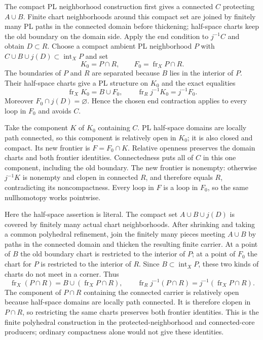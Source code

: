The compact PL neighborhood construction first gives a connected $C$
protecting $A\cup B$. Finite chart neighborhoods around this compact set
are joined by finitely many PL paths in the connected domain before
thickening; half-space charts keep the old boundary on the domain side.
Apply the end condition to $j^{-1}C$ and obtain $D\subset R$.
Choose a compact ambient PL neighborhood $P$ with
$C\cup B\cup j(D)\subset\operatorname{int}_X P$ and set
\[
 K_0=P\cap R,\qquad F_0=\operatorname{fr}_X P\cap R.
\]
The boundaries of $P$ and $R$ are separated because $B$ lies in the
interior of $P$. Their half-space charts give a PL structure on $K_0$
and the exact equalities
\[
 \operatorname{fr}_X K_0=B\cup F_0,
 \qquad\operatorname{fr}_R j^{-1}K_0=j^{-1}F_0.
\]
Moreover $F_0\cap j(D)=\varnothing$. Hence the chosen end contraction
applies to every loop in $F_0$ and avoids $C$.

Take the component $K$ of $K_0$ containing $C$. PL half-space domains are
locally path connected, so this component is relatively open in $K_0$;
it is also closed and compact. Its new frontier is $F=F_0\cap K$.
Relative openness preserves the domain charts and both frontier identities.
Connectedness puts all of $C$ in this one component, including the old
boundary. The new frontier is nonempty: otherwise $j^{-1}K$ is nonempty
and clopen in connected $R$, and therefore equals $R$, contradicting its
noncompactness. Every loop in $F$ is a loop in $F_0$, so the same
nullhomotopy works pointwise.

Here the half-space assertion is literal. The compact set
$A\cup B\cup j(D)$ is covered by finitely many actual chart neighborhoods.
After shrinking and taking a common polyhedral refinement, join the finitely
many pieces meeting $A\cup B$ by paths in the connected domain and thicken
the resulting finite carrier. At a point of $B$ the old boundary chart is
restricted to the interior of $P$; at a point of $F_0$ the chart for $P$ is
restricted to the interior of $R$. Since $B\subset\operatorname{int}_X P$,
these two kinds of charts do not meet in a corner. Thus
\[
 \operatorname{fr}_X(P\cap R)=B\cup(\operatorname{fr}_X P\cap R),
 \qquad
 \operatorname{fr}_R j^{-1}(P\cap R)=j^{-1}(\operatorname{fr}_X P\cap R).
\]
The component of $P\cap R$ containing the connected carrier is relatively
open because half-space domains are locally path connected. It is therefore
clopen in $P\cap R$, so restricting the same charts preserves both frontier
identities. This is the finite polyhedral construction in the
protected-neighborhood and connected-core producers; ordinary compactness
alone would not give these identities.

